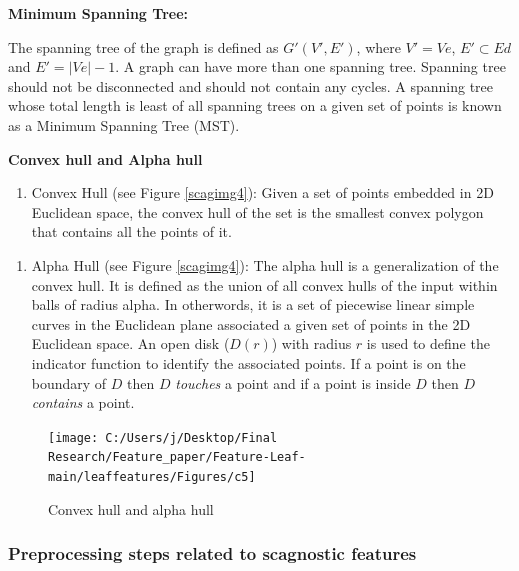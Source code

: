 \documentclass{article}
\begin{document}
\textbf{Minimum Spanning Tree:}

The spanning tree of the graph is defined as \(G'(V',E')\), where
\(V' = Ve\), \(E' \subset Ed\) and \(E' = |Ve|-1\). A graph can have
more than one spanning tree. Spanning tree should not be disconnected
and should not contain any cycles. A spanning tree whose total length is
least of all spanning trees on a given set of points is known as a
Minimum Spanning Tree (MST).

\textbf{Convex hull and Alpha hull}

\begin{enumerate}
\def\labelenumi{\roman{enumi})}
\tightlist
\item
  Convex Hull (see Figure \ref{scagimg4}): Given a set of points
  embedded in 2D Euclidean space, the convex hull of the set is the
  smallest convex polygon that contains all the points of it.
\end{enumerate}

\begin{enumerate}
\def\labelenumi{\roman{enumi})}
\setcounter{enumi}{1}
\tightlist
\item
  Alpha Hull (see Figure \ref{scagimg4}): The alpha hull is a
  generalization of the convex hull. It is defined as the union of all
  convex hulls of the input within balls of radius alpha. In otherwords,
  it is a set of piecewise linear simple curves in the Euclidean plane
  associated a given set of points in the 2D Euclidean space. An open
  disk (\(D(r)\)) with radius \(r\) is used to define the indicator
  function to identify the associated points. If a point is on the
  boundary of \(D\) then \(D\) \textit{touches} a point and if a point
  is inside \(D\) then \(D\) \textit{contains} a point.
\end{enumerate}

\begin{figure}[!ht]

{\centering \texttt{[image: C:/Users/j/Desktop/Final Research/Feature\_paper/Feature-Leaf-main/leaffeatures/Figures/c5]} 

}

\caption{\label{scagimg4}Convex hull and alpha hull}\label{fig:unnamed-chunk-32}
\end{figure}

\hypertarget{preprocessing-steps-related-to-scagnostic-features}{%
\subsubsection{Preprocessing steps related to scagnostic
features}\label{preprocessing-steps-related-to-scagnostic-features}}
\end{document}

